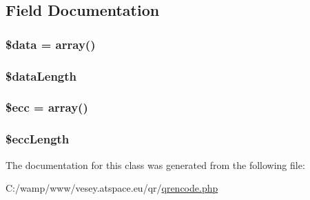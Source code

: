 \subsection{Field Documentation}
\hypertarget{class_q_rrsblock_a6efc15b5a2314dd4b5aaa556a375c6d6}{
\subsubsection[{\$data}]{\setlength{\rightskip}{0pt plus 5cm}\$data = array()}}\label{class_q_rrsblock_a6efc15b5a2314dd4b5aaa556a375c6d6}
\hypertarget{class_q_rrsblock_a7bc9d25a373f0c0b88cfecda04f9cc58}{
\subsubsection[{\$data\-Length}]{\setlength{\rightskip}{0pt plus 5cm}\$data\-Length}}\label{class_q_rrsblock_a7bc9d25a373f0c0b88cfecda04f9cc58}
\hypertarget{class_q_rrsblock_abf124ae3078409505ef186d22fd0a042}{
\subsubsection[{\$ecc}]{\setlength{\rightskip}{0pt plus 5cm}\$ecc = array()}}\label{class_q_rrsblock_abf124ae3078409505ef186d22fd0a042}
\hypertarget{class_q_rrsblock_aec29857483c6cbfe18632d3d634bcc0c}{
\subsubsection[{\$ecc\-Length}]{\setlength{\rightskip}{0pt plus 5cm}\$ecc\-Length}}\label{class_q_rrsblock_aec29857483c6cbfe18632d3d634bcc0c}


The documentation for this class was generated from the following file\-:\begin{DoxyCompactItemize}
\item 
C\-:/wamp/www/vesey.\-atspace.\-eu/qr/\hyperlink{qrencode_8php}{qrencode.\-php}\end{DoxyCompactItemize}
